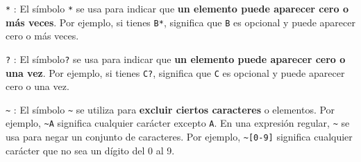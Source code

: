 \lstinline[basicstyle=\large\ttfamily]|*| : El símbolo \lstinline[basicstyle=\large\ttfamily]|*| se usa para indicar que \textbf{un elemento puede aparecer cero o más veces}. Por ejemplo, si tienes \lstinline[basicstyle=\large\ttfamily]|B*|, significa que \lstinline[basicstyle=\large\ttfamily]|B| es opcional y puede aparecer cero o más veces.

\lstinline[basicstyle=\large\ttfamily]|?| : El símbolo\lstinline[basicstyle=\large\ttfamily]|?| se usa para indicar que \textbf{un elemento puede aparecer cero o una vez}. Por ejemplo, si tienes \lstinline[basicstyle=\large\ttfamily]|C?|, significa que \lstinline[basicstyle=\large\ttfamily]|C| es opcional y puede aparecer cero o una vez.


\lstinline[basicstyle=\large\ttfamily]|~| : El símbolo \lstinline[basicstyle=\large\ttfamily]|~| se utiliza para \textbf{excluir ciertos caracteres} o elementos. Por ejemplo, \lstinline[basicstyle=\large\ttfamily]|~A| significa cualquier carácter excepto \lstinline[basicstyle=\large\ttfamily]|A|. En una expresión regular, \lstinline[basicstyle=\large\ttfamily]|~| se usa para negar un conjunto de caracteres. Por ejemplo, \lstinline[basicstyle=\large\ttfamily]|~[0-9]| significa cualquier carácter que no sea un dígito del 0 al 9.


